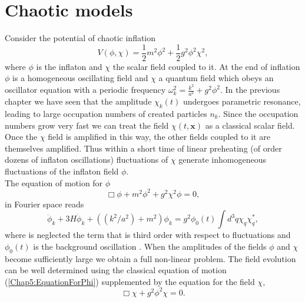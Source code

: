 \documentclass[11pt,a4paper,twoside]{book}
\begin{document}
\section{Chaotic models}
Consider the potential of chaotic inflation
\begin{equation}
\label{Chap5:ChaoticModel_potential}
V(\phi,	\chi)= \frac{1}{2}m^{2}\phi^{2} + \frac{1}{2}g^{2}\phi^{2}\chi^{2},
\end{equation}
where $\phi$ is the inflaton and $\chi$ the scalar field coupled to it. At the end of inflation $\phi$ is a homogeneous oscillating field and $\chi$ a quantum field which obeys an oscillator equation with a periodic frequency $ \omega_{k}^{2}=\frac{k^{2}}{a^{2}} + g^{2}\phi^{2} $. In the previous chapter we have seen that the amplitude $\chi_{k}(t)$ undergoes parametric resonance, leading to large occupation numbers of created particles $ n_{k} $. Since the occupation numbers grow very fast we can treat the field $\chi(t,\textbf{x})$ as a classical scalar field. Once the $\chi$ field is amplified in this way, the other fields coupled to it are themselves amplified. Thus within a short time of linear preheating (of order dozens of inflaton oscillations) fluctuations of $\chi$ generate inhomogeneous fluctuations of the inflaton field $\phi$.\\
 The equation of motion for $\phi$
\begin{equation}
\label{Chap5:EquationForPhi}
\Box\phi + m^{2}\phi^{2} + g^{2}\chi^{2}\phi = 0,
\end{equation}
in Fourier space reads
\begin{equation}
\label{Chap5:EquationForPhiFourierSpace}
\ddot{\phi}_{k} + 3H\dot{\phi}_{k} + ((k^{2}/a^{2}) + m^{2})\phi_{k} = g^{2}\phi_{0}(t) \int d^{3}q\chi_{q}\chi_{q}^{*},
\end{equation}
where is neglected the term that is third order with respect to fluctuations and $\phi_{0}(t)$ is the background oscillation \cite{Chap5:Fragmentation}. When the amplitudes of the fields $\phi$ and $\chi$ become sufficiently large we obtain a full non-linear problem. The field evolution can be well determined using the classical equation of motion (\ref{Chap5:EquationForPhi}) supplemented by the equation for the field $\chi$,
\begin{equation}
\label{	Chap5:ChaoticModelEquationForChi}
\Box \chi + g^{2}\phi^{2}\chi=0.
\end{equation}
\end{document}
